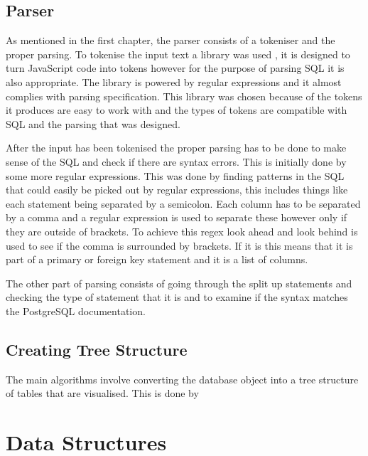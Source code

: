 \subsection{Parser}

As mentioned in the first chapter, the parser consists of a tokeniser and the proper parsing. To tokenise the input text a library was used \cite{tokeniser}, it is designed to turn JavaScript code into tokens however for the purpose of parsing SQL it is also appropriate. The library is powered by regular expressions and it almost complies with parsing specification. This library was chosen because of the tokens it produces are easy to work with and the types of tokens are compatible with SQL and the parsing that was designed.

After the input has been tokenised the proper parsing has to be done to make sense of the SQL and check if there are syntax errors. This is initially done by some more regular expressions. This was done by finding patterns in the SQL that could easily be picked out by regular expressions, this includes things like each statement being separated by a semicolon. Each column has to be separated by a comma and a regular expression is used to separate these however only if they are outside of brackets.  To achieve this regex look ahead and look behind is used to see if the comma is surrounded by brackets. If it is this means that it is part of a primary or foreign key statement and it is a list of columns.

The other part of parsing consists of going through the split up statements and checking the type of statement that it is and to examine if the syntax matches the PostgreSQL documentation.  



\subsection{Creating Tree Structure}

The main algorithms involve converting the database object into a tree structure of tables that are visualised. This is done by 

\section{Data Structures}


